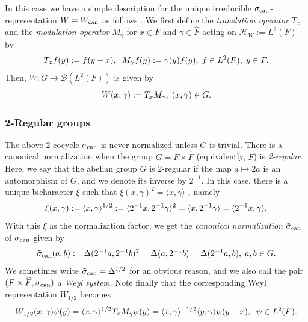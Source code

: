 \documentclass[12pt,reqno]{amsart}
\theoremstyle{definition}
\theoremstyle{definition}
\theoremstyle{definition}
\numberwithin{thm}{section}
\numberwithin{equation}{section}
\newcommand{\la}{\langle}
\newcommand{\ra}{\rangle}
\newcommand{\Hi}{\mathcal{H}}
\newcommand{\mc}[1]{\mathcal #1}
\newcommand{\tcr}[1]{\textcolor{red}{#1}}
\begin{document}
In this case we have a simple description for the unique irreducible $\sigma_{\rm can}$-representation $W = W_{\rm can}$ as follows \cite{Prasad11}. We first define the {\em translation operator} $T_x$ and the {\em modulation operator} $M_\gamma$ for $x\in F$ and $\gamma \in \widehat{F}$ acting on $\Hi_W := L^2(F)$ by
	\begin{equation}
\notag 	    T_xf(y) := f(y-x),\;\; M_\gamma f(y) := \gamma(y)f(y),\; f\in L^2(F),\; y\in F.
	\end{equation}
	Then, $W:G \to \mc B(L^2(F))$ is given by
	\begin{equation}
	\notag     W(x,\gamma) := T_xM_\gamma,\; (x,\gamma)\in G.
	\end{equation}

\subsubsection{2-Regular groups}
The above 2-cocycle $\sigma_{\rm can}$ is never normalized unless $G$ is trivial. There is a canonical normalization when the group $G=F\times\widehat{F}$ (equivalently, $F$) is {\it 2-regular}. Here, we say that the abelian group $G$ is 2-regular if the map $a  \mapsto 2 a $ is an automorphism of $G$, and we denote its inverse by $2^{-1}$. In this case, there is a unique bicharacter $\xi$ such that $\xi(x,\gamma)^2=\la x,\gamma\ra$ \cite[Lemma 1]{DigernesVaradarajan04}, namely
    \begin{equation}
  \notag   \xi(x,\gamma):=\la x,\gamma \ra ^{1/2}:=\la 2^{-1}x,2^{-1}\gamma \ra^2=\la x,2^{-1}\gamma \ra=\la 2^{-1}x,\gamma \ra.    
    \end{equation}
    With this $\xi$ as the normalization factor, we get the
{\em canonical normalization} $\tilde{\sigma}_{\rm can}$ of $\sigma_{\rm can}$ given by
\begin{equation}\label{eq-normalization}
	\tilde{\sigma}_{\rm can}( a , b ) :=  \Delta(2^{-1} a ,2^{-1} b )^2 =\Delta( a ,2^{-1} b ) =\Delta(2^{-1} a ,b ), \; a,b\in G.
\end{equation}
We sometimes write $\tilde{\sigma}_{\rm can} = \Delta^{1/2}$ for an obvious reason, and we also call the pair $(F\times \widehat{F}, \tilde{\sigma}_{\rm can})$ a {\em Weyl system}.
Note finally that the corresponding Weyl representation $W_{1/2}$ becomes
    \begin{equation}
  \notag  W_{1/2}(x,\gamma)\psi(y)=\la x,\gamma \ra^{1/2} T_x M_{\gamma}\psi(y)=\la x,\gamma \ra^{-1/2} \la y, \gamma\ra \psi(y-x),\;\; \psi\in L^2(F).
    \end{equation}
    
\end{document}
